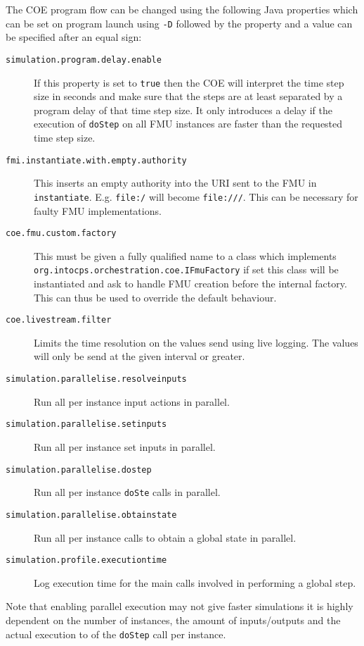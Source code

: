 The COE program flow can be changed using the following Java properties which can be set on program launch using \texttt{-D} followed by the property and a value can be specified after an equal sign:

\begin{description}
\item[\texttt{simulation.program.delay.enable}] If this property is set to \texttt{true} then the COE will interpret the time step size in seconds and make sure that the steps are at least separated by a program delay of that time step size. It only introduces a delay if the execution of \texttt{doStep} on all FMU instances are faster than the requested time step size.
\item[\texttt{fmi.instantiate.with.empty.authority}] This inserts an empty authority into the URI sent to the FMU in \texttt{instantiate}. E.g. \texttt{file:/} will become \texttt{file:///}. This can be necessary for faulty FMU implementations.
\item[\texttt{coe.fmu.custom.factory}] This must be given a fully qualified name to a class which implements \texttt{org.intocps.orchestration.coe.IFmuFactory} if set this class will be instantiated and ask to handle FMU creation before the internal factory. This can thus be used to override the default behaviour.
\item[\texttt{coe.livestream.filter}] Limits the time resolution on the values send using live logging. The values will only be send at the given interval or greater.

\item[\texttt{simulation.parallelise.resolveinputs}] Run all per instance input actions in parallel. 
\item[\texttt{simulation.parallelise.setinputs}]  Run all per instance set inputs in parallel.
\item[\texttt{simulation.parallelise.dostep}]  Run all per instance \texttt{doSte} calls in parallel.
\item[\texttt{simulation.parallelise.obtainstate}] Run all per instance calls to obtain a global state in parallel.
\item[\texttt{simulation.profile.executiontime}] Log execution time for the main calls involved in performing a global step.

\end{description}

Note that enabling parallel execution may not give faster simulations it is highly dependent on the number of instances, the amount of inputs/outputs and the actual execution to of the \texttt{doStep} call per instance.
